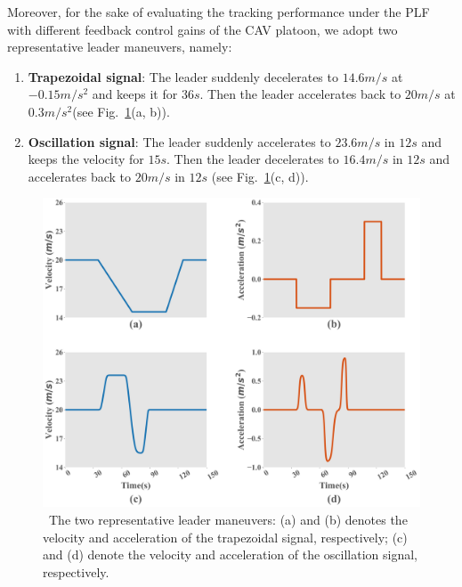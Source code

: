 \documentclass[a4paper]{cas-sc}
\begin{document}
Moreover, for the sake of evaluating the tracking performance under the PLF with different feedback control gains of the CAV platoon, we adopt two representative leader maneuvers, namely:
\begin{enumerate}
  \item \textbf{Trapezoidal signal}: The leader suddenly decelerates to $14.6m/s$ at $ - 0.15m/{s^2}$ and keeps it for $36s$. Then the leader accelerates back to $20m/s$ at $ 0.3m/{s^2} $(see Fig.~\ref{fig3}(a, b)).
  \item \textbf{Oscillation signal}: The leader suddenly accelerates to $23.6m/s$ in $12s$ and keeps the velocity for $15s$. Then the leader decelerates to $16.4m/s$ in $12s$ and accelerates back to $20m/s$ in $12s$ (see Fig.~\ref{fig3}(c, d)).
\end{enumerate}

\begin{figure}

  \centering
  \includegraphics[width=14cm]{figs/fig3.png}
  \caption{~The two representative leader maneuvers: (a) and (b) denotes the velocity and acceleration of the trapezoidal signal, respectively; (c) and (d) denote the velocity and acceleration of the oscillation signal, respectively.}
  \label{fig3}

\end{figure}
\end{document}

